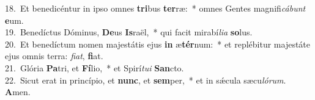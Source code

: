 {18.~}Et benedicéntur in ipso omnes \textbf{tri}bus \textbf{ter}ræ:~* omnes Gentes magnifi\textit{cá}\textit{bunt} \textbf{e}um.\\
{19.~}Benedíctus Dóminus, \textbf{De}us \textbf{Is}raël,~* qui facit mirabí\textit{li}\textit{a} \textbf{so}lus.\\
{20.~}Et benedíctum nomen majestátis ejus \textbf{in} æ\textbf{tér}num:~* et replébitur majestáte ejus omnis terra: \textit{fi}\textit{at}, \textbf{fi}at.\\
{21.~}Glória \textbf{Pa}tri, et \textbf{Fí}lio,~* et Spirí\textit{tu}\textit{i} \textbf{San}cto.\\
{22.~}Sicut erat in princípio, et \textbf{nunc}, et \textbf{sem}per,~* et in sǽcula sæcu\textit{ló}\textit{rum}. \textbf{A}men.\\
